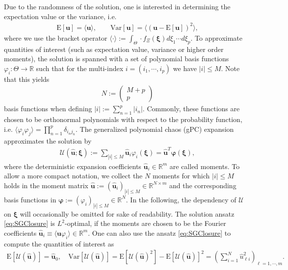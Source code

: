 Due to the randomness of the solution, one is interested in determining the expectation value or the variance, i.e.
\begin{align*}
\text{E}[\bm{u}] = \langle \bm{u} \rangle,\qquad \text{Var}[\bm{u}] = \langle \left( \bm{u}-\text{E}[\bm{u}]\right)^2\rangle,
\end{align*}
where we use the bracket operator $\langle \cdot \rangle := \int_{\Theta} \cdot f_{\Xi}(\bm\xi)d\xi_1 \cdots d\xi_p$. To approximate quantities of interest (such as expectation value, variance or higher order moments), the solution is spanned with a set of polynomial basis functions $\varphi_{i}:\Theta\to\mathbb{R}$ such that for the multi-index $i = (i_1,\cdots,i_p)$ we have $|i| \leq M$. Note that this yields
\begin{align}\label{eq:numberBasisFcts}
N:=\begin{pmatrix}
M+p \\ p
\end{pmatrix}
\end{align}
basis functions when defining $|i|:=\sum_{n = 1}^p |i_n|$. Commonly, these functions are chosen to be orthonormal polynomials \cite{wiener1938homogeneous} with respect to the probability function, i.e. $\langle \varphi_i \varphi_j \rangle =\prod_{n=1}^p\delta_{i_nj_n}$. The generalized polynomial chaos (gPC) expansion \cite{xiu2002wiener} approximates the solution by
\begin{align}\label{eq:SGClosure}
\mathcal{U}(\bm{\hat u};\bm\xi):= \sum_{|i|\leq M} \bm{\hat{u}}_i\varphi_i(\bm{\xi}) = \hat{\bm u}^T\bm{\varphi}(\bm\xi),
\end{align}
where the deterministic expansion coefficients $\bm{\hat{u}}_i\in\mathbb{R}^m$ are called moments. To allow a more compact notation, we collect the $N$ moments for which $\vert i \vert \leq M$ holds in the moment matrix $\hat{\bm u}:=(\bm{\hat{u}}_i)_{|i|\leq M}\in\mathbb{R}^{N\times m}$ and the corresponding basis functions in $\bm{\varphi}:=(\varphi_i)_{|i|\leq M}\in\mathbb{R}^{N}$. In the following, the dependency of $\mathcal{U}$ on $\bm \xi$ will occasionally be omitted for sake of readability. The solution ansatz \eqref{eq:SGClosure} is $L^2$-optimal, if the moments are chosen to be the Fourier coefficients $\bm{\hat u}_i \equiv \langle \bm{u}\varphi_i \rangle\in\mathbb{R}^m$. One can also use the ansatz \eqref{eq:SGClosure} to compute the quantities of interest as
\begin{align*}
\text{E}[\mathcal{U}(\bm{\hat u})] = \bm{\hat u}_0,\quad \text{Var}[\mathcal{U}(\bm{\hat u})] = \text{E}[\mathcal{U}(\bm{\hat u})^2] - \text{E}[\mathcal{U}(\bm{\hat u})]^2 = \left(\sum_{i = 1}^N \hat{u}_{\ell i}^2\right)_{\ell = 1,\cdots,m}.
\end{align*}

